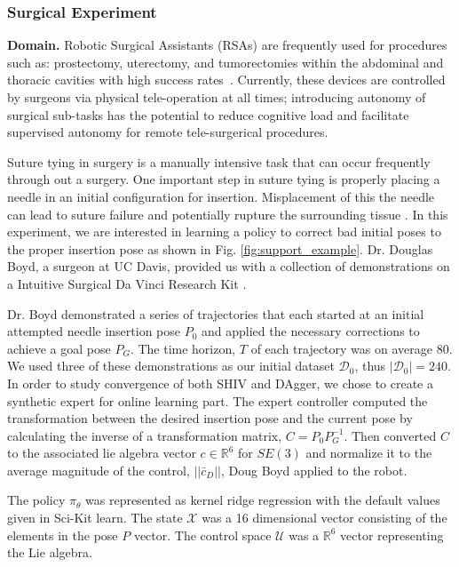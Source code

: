 \documentclass[10pt, conference]{ieeeconf}      %
\begin{document}
\subsubsection{Surgical Experiment}

\noindent\textbf{Domain.}
Robotic Surgical Assistants (RSAs) are frequently used for procedures such as: prostectomy, uterectomy, and tumorectomies within the abdominal and thoracic cavities with high success rates~\cite{van2013laparoscopic,darzi2004impact}. Currently, these devices are controlled by surgeons via physical tele-operation at all times; introducing autonomy of surgical sub-tasks has the potential to reduce cognitive load and facilitate supervised autonomy for remote tele-surgerical procedures.

Suture tying in surgery is a manually intensive task that can occur frequently through out a surgery. One important step
in suture tying is properly placing a needle in an initial configuration for insertion. Misplacement of this the needle
can lead to suture failure and potentially rupture the surrounding tissue \cite{liu2015optimal}. In this experiment, we
are interested in learning a policy to correct bad initial poses to the proper insertion pose as shown in Fig.
\ref{fig:support_example}. Dr. Douglas Boyd, a surgeon at UC Davis, provided us with a collection of demonstrations on a Intuitive Surgical Da Vinci Research Kit \cite{AnnualReport2014}.

Dr. Boyd demonstrated a series of trajectories that each started at an initial attempted needle insertion pose $P_0$ and
applied the necessary corrections to achieve a goal pose $P_G$. The time horizon, $T$ of each trajectory was on average 80.  We used three of these demonstrations as our initial
dataset $\mathcal{D}_0$, thus $|\mathcal{D}_0| = 240$. In order to study convergence of both SHIV and DAgger, we chose to create a synthetic expert for online learning part. The expert controller computed the transformation between the desired insertion pose and the current pose  by calculating the inverse of a transformation matrix, $C = P_0P_G^{-1}$. Then converted $C$ to the associated lie algebra vector $c \in \mathbb{R}^6$ for $SE(3)$ and normalize it to the average magnitude of the control,  $||\bar{c}_D||$, Doug Boyd applied to the robot. 

The policy $\pi_{\theta}$ was represented as kernel ridge regression with the default values given in Sci-Kit learn. The state $\mathcal{X}$ was  a 16 dimensional vector consisting of the elements in the pose $P$ vector. The control space $\mathcal{U}$ was a $\mathbb{R}^6$ vector representing the Lie algebra. 
\end{document}
